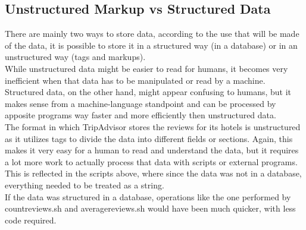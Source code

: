 \documentclass{article}
\begin{document}
	\subsection{Unstructured Markup vs Structured Data}
	There are mainly two ways to store data, according to the use that will be made of the data, it is possible to store it in a structured way (in a database) or in an unstructured way (tags and markups).\\
	While unstructured data might be easier to read for humans, it becomes very inefficient when that data has to be manipulated or read by a machine. Structured data, on the other hand, might appear confusing to humans, but it makes sense from a machine-language standpoint and can be processed by apposite programs way faster and more efficiently then unstructured data.\\
	The format in which TripAdvisor stores the reviews for its hotels is unstructured as it utilizes tags to divide the data into different fields or sections. Again, this makes it very easy for a human to read and understand the data, but it requires a lot more work to actually process that data with scripts or external programs. This is reflected in the scripts above, where since the data was not in a database, everything needed to be treated as a string.\\
	If the data was structured in a database, operations like the one performed by countreviews.sh and averagereviews.sh would have been much quicker, with less code required.
	
\end{document}
